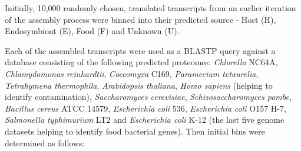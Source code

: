 Initially, 10,000 randomly chosen, translated transcripts from an earlier iteration
of the assembly process were binned into their predicted source - 
Host (H), Endosymbiont (E), Food (F) and Unknown (U).  


Each of the assembled transcripts were used as a BLASTP query against a database consisting of the following predicted proteomes: 
\textit{Chlorella} NC64A, \textit{Chlamydomonas reinhardtii}, \textit{Coccomyxa} C169,
\textit{Paramecium tetaurelia}, \textit{Tetrahymena thermophila}, \textit{Arabidopsis thaliana}, \textit{Homo sapiens} (helping to identify contamination), \textit{Saccharomyces cerevisiae}, \textit{Schizosaccharomyces pombe}, \textit{Bacillus
cereus} ATCC 14579, \textit{Escherichia coli} 536, \textit{Escherichia coli} O157 H-7, \textit{Salmonella typhimurium}
LT2 and \textit{Escherichia coli} K-12 (the last five genome datasets helping to identify food bacterial
genes). Then initial bins were determined as follows:
